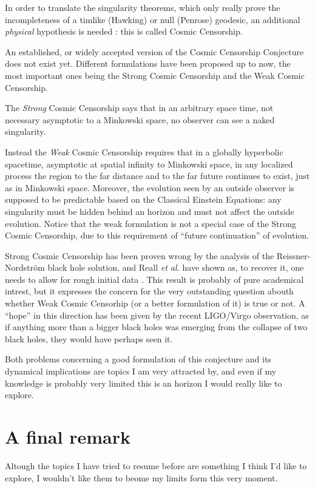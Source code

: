 \documentclass[12pt, a4paper]{article}
\begin{document}
In order to translate the singularity theorems, which only really prove the incompleteness of a timlike (Hawking) or null (Penrose) geodesic, an additional \emph{physical} hypothesis is needed \cite{witten2020light}: this is called Cosmic Censorship.

An established, or widely accepted version of the Cosmic Censorship Conjecture does not exist yet. Different formulations have been proposed up to now, the most important ones being the Strong Cosmic Censorship and the Weak Cosmic Censorship.

The \emph{Strong} Cosmic Censorship says that in an arbitrary space time, not necessary asymptotic to a Minkowski space, no observer can see a naked singularity.

Instead the \emph{Weak} Cosmic Censorship requires that in a globally hyperbolic spacetime, asymptotic at spatial infinity to Minkowski space, in any localized process the region to the far distance and to the far future continues to exist, just as in Minkowski space. Moreover, the evolution seen by an outside observer is supposed to be predictable based on the Classical Einstein Equations: any singularity must be hidden behind an horizon and must not affect the outside evolution.
Notice that the weak formulation is not a special case of the Strong Cosmic Censorship, due to this requirement of ``future continuation'' of evolution.

Strong Cosmic Censorship has been proven wrong by the analysis of the Reissner-Nordstr\"om black hole solution, and Reall \emph{et al.} have shown as, to recover it, one needs to allow for rough initial data \cite{dias2018strong}.
This result is probably of pure academical intrest, but it expresses the concern for the very outstanding question abouth whether Weak Cosmic Censorhip (or a better formulation of it) is true or not. 
A ``hope'' in this direction has been given by the recent LIGO/Virgo observation, as if anything more than a bigger black holes was emerging from the collapse of two black holes, they would have perhaps seen it.

Both problems concerning a good formulation of this conjecture and its dynamical implications are topics I am very attracted by, and even if my knowledge is probably very limited this is an horizon I would really like to explore.

\section{A final remark}
Altough the topics I have tried to resume before are something I think I'd like to  explore, I wouldn't like them to beome my limits form this very moment. 
\end{document}
